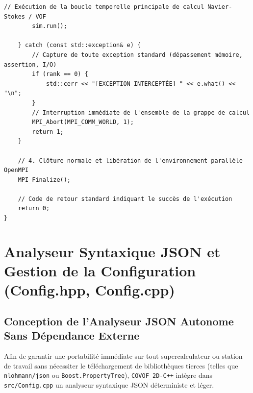 \documentclass[10pt,a4paper,oneside]{book}
\begin{document}
\begin{lstlisting}[language={[11]C++}]
        // Exécution de la boucle temporelle principale de calcul Navier-Stokes / VOF
        sim.run();

    } catch (const std::exception& e) {
        // Capture de toute exception standard (dépassement mémoire, assertion, I/O)
        if (rank == 0) {
            std::cerr << "[EXCEPTION INTERCEPTÉE] " << e.what() << "\n";
        }
        // Interruption immédiate de l'ensemble de la grappe de calcul
        MPI_Abort(MPI_COMM_WORLD, 1);
        return 1;
    }

    // 4. Clôture normale et libération de l'environnement parallèle OpenMPI
    MPI_Finalize();

    // Code de retour standard indiquant le succès de l'exécution
    return 0;
}

\end{lstlisting}

\chapter{Analyseur Syntaxique JSON et Gestion de la Configuration (Config.hpp, Config.cpp)}
\section{Conception de l'Analyseur JSON Autonome Sans Dépendance Externe}
Afin de garantir une portabilité immédiate sur tout supercalculateur ou station de travail sans nécessiter le téléchargement de bibliothèques tierces (telles que \texttt{nlohmann/json} ou \texttt{Boost.PropertyTree}), \texttt{COVOF\_2D-C++} intègre dans \texttt{src/Config.cpp} un analyseur syntaxique JSON déterministe et léger.
\end{document}
